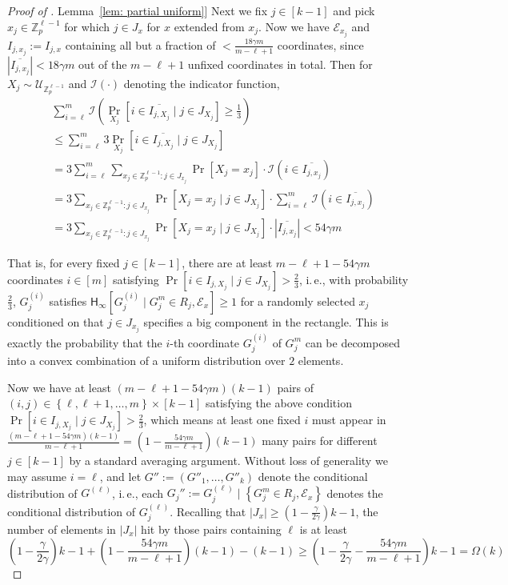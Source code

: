\documentclass[11pt]{article}
\numberwithin{equation}{section}
\theoremstyle{definition}
\theoremstyle{plain}
\newcommand{\Z}{\mathbb Z}
\newcommand{\ie}{i.\,e.}
\newcommand{\expref}[2]{\hyperref[#2]{#1~\ref{#2}}}
\newcommand{\set}[1]{{\left \{{#1} \right \}}}
\newcommand{\cond}{\;|\;}
\newcommand{\Cond}{\;\Big|\;}
\newcommand{\follows}{\ensuremath{\sim}}
\newcommand{\bigomega}[1]{\ensuremath{{\Omega \left( {#1} \right)}}}
\newcommand{\eqdef}{\ensuremath{:=}}
\newcommand{\Hmin}{\ensuremath{\mathsf{H}_{\infty}}}
\newcommand{\event}{\ensuremath{\mathcal{E}}}
\begin{document}
\begin{proof}[Proof of \expref{Lemma}{lem: partial uniform}]
		Next we fix $j\in [k-1]$ and pick $x_j\in\Z_p^{\ell-1}$ for which $j\in J_{x}$ for $x$ extended from $x_j$.
		Now we have $\event_{x_j}$ and $I_{j,x_j} \eqdef I_{j,x}$ containing all but a fraction of $<\frac{18\gamma m}{m-\ell+1}$ coordinates, since $\left|\overline{I_{j,x_j}}\right|< 18\gamma m$ out of the $m-\ell+1$ unfixed coordinates in total.
		Then for $X_j\follows \mathcal{U}_{\Z_p^{\ell-1}}$ and $\mathcal{I}(\cdot)$ denoting the indicator function, 
		\begin{align*}
			& \sum_{i=\ell}^m \mathcal{I}\left( \Pr_{X_j}\left[ i\in \overline{I_{j,X_j}} \Cond j\in J_{X_j} \right] \ge \frac{1}{3}\right)\\
			&\le \sum_{i=\ell}^m 3 \Pr_{X_j} \left[ i\in \overline{I_{j,X_j}} \Cond j\in J_{X_j} \right] \\
			&= 3\sum_{i=\ell}^m \sum_{x_j\in \Z_p^{\ell-1}: j\in J_{x_j}} \Pr[X_j={x_j}] \cdot \mathcal{I}\left(  i\in \overline{I_{j,x_j}} \right)\\
			&= 3 \sum_{x_j\in \Z_p^{\ell-1}: j\in J_{x_j}} \Pr[X_j={x_j}\cond j\in J_{X_j}] \cdot \sum_{i=\ell}^m  \mathcal{I}\left(  i\in \overline{I_{j,x_j}} \right)\\
			&=  3 \sum_{x_j\in \Z_p^{\ell-1}: j\in J_{x_j}} \Pr[X_j={x_j}\cond j\in J_{X_j}] \cdot \left| \overline{I_{j,x_j}} \right|
			< 54 \gamma m
		\end{align*}

		That is, for every fixed  $j\in [k-1]$, there are at least $m-\ell+1-54\gamma m$ coordinates $i\in [m]$ satisfying $\Pr \left[ i\in I_{j,X_j} \Cond j\in J_{X_j} \right] > \frac{2}{3}$,
		\ie, with probability $\frac{2}{3}$, $G_j^{(i)}$ satisfies $\Hmin\left[ G_j^{(i)}\cond G_j^m\in R_j,\event_x  \right]\ge 1$ for a randomly selected $x_j$ conditioned on that $j\in J_{x_j}$ specifies a big component in the rectangle.
		This is exactly the probability that the $i$-th coordinate $G_j^{(i)} $ of $G_j^m$ can be decomposed into a convex combination of a uniform distribution over $2$ elements.

		Now we have at least $(m-\ell+1-54\gamma m)(k-1)$ pairs of $(i,j)\in \set{\ell,\ell+1,\dots,m}\times[k-1]$ satisfying the above condition $\Pr \left[ i\in I_{j,X_j} \Cond j\in J_{X_j} \right] > \frac{2}{3}$, 
		which means at least one fixed $i$ must appear in 
		$\frac {(m-\ell+1-54\gamma m)(k-1)}{m-\ell+1} = \left(1- \frac {54\gamma m}{m-\ell+1}\right)(k-1)$ many pairs for different $j\in[k-1]$ by a standard averaging argument.
		Without loss of generality we may assume $i=\ell$, and let $G''\eqdef(G''_1,\dots,G''_k)$ denote the conditional distribution of $G^{(\ell)}$, \ie, each $G_j''\eqdef G_j^{(\ell)}\Cond\set{G_j^m\in R_j,\event_x}$ denotes the conditional distribution of $G_j^{(\ell)}$. 
		Recalling that $|J_x|\ge \left(1-\frac{\gamma}{2\gamma}\right)k-1$, 
		the number of elements in $|J_x|$ hit by those pairs containing $\ell$ is at least
		$$\left(1-\frac{\gamma}{2\gamma}\right)k-1 +  \left(1- \frac {54\gamma m}{m-\ell+1}\right)(k-1) - (k-1) \ge  \left(1-\frac{\gamma}{2\gamma}- \frac {54\gamma m}{m-\ell+1}\right)k-1=\bigomega{k}$$ 


\end{proof}
\end{document}
